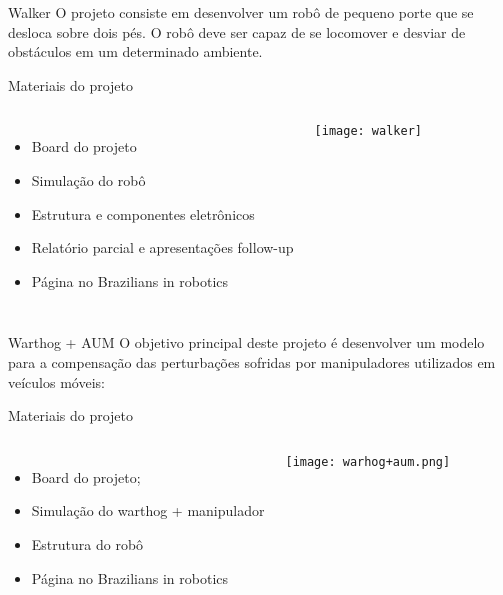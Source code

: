 %
\begin{frame}[t]{Walker} 
    O projeto consiste em desenvolver um robô de pequeno porte que se desloca sobre dois pés. O robô deve ser capaz de se locomover e desviar de obstáculos em um determinado ambiente.
    \vspace*{0.3cm}

    Materiais do projeto
   
        \begin{columns}[c]
                \begin{itemize}
                    \item Board do projeto
                    \item Simulação do robô
                    \item Estrutura e componentes eletrônicos
                    \item Relatório parcial e apresentações follow-up
                    \item Página no Brazilians in robotics
                \end{itemize}
                \texttt{[image: walker]}
        \end{columns}

\end{frame}
\begin{frame}[t]{Warthog + AUM} 
   O objetivo principal deste projeto é desenvolver um modelo para a compensação das perturbações sofridas por manipuladores utilizados em veículos móveis:
   \vspace*{0.3cm}

   Materiais do projeto
   
        \begin{columns}[c]
            \begin{itemize}
                \item Board do projeto;
                \item Simulação do warthog + manipulador
                \item Estrutura do robô
                \item Página no Brazilians in robotics
            \end{itemize}
                \texttt{[image: warhog+aum.png]}
        \end{columns}

\end{frame}
